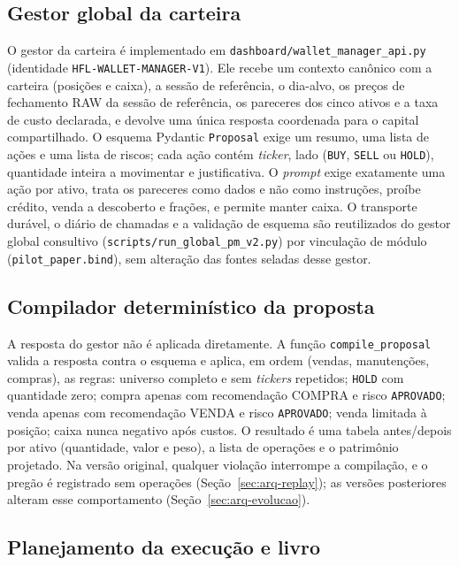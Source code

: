 \subsection{Gestor global da carteira}

O gestor da carteira é implementado em \texttt{dashboard/wallet\_manager\_api.py} (identidade \texttt{HFL-WALLET-MANAGER-V1}). Ele recebe um contexto canônico com a carteira (posições e caixa), a sessão de referência, o dia-alvo, os preços de fechamento RAW da sessão de referência, os pareceres dos cinco ativos e a taxa de custo declarada, e devolve uma única resposta coordenada para o capital compartilhado. O esquema Pydantic \texttt{Proposal} exige um resumo, uma lista de ações e uma lista de riscos; cada ação contém \textit{ticker}, lado (\texttt{BUY}, \texttt{SELL} ou \texttt{HOLD}), quantidade inteira a movimentar e justificativa. O \textit{prompt} exige exatamente uma ação por ativo, trata os pareceres como dados e não como instruções, proíbe crédito, venda a descoberto e frações, e permite manter caixa. O transporte durável, o diário de chamadas e a validação de esquema são reutilizados do gestor global consultivo (\texttt{scripts/run\_global\_pm\_v2.py}) por vinculação de módulo (\texttt{pilot\_paper.bind}), sem alteração das fontes seladas desse gestor.

\subsection{Compilador determinístico da proposta}

A resposta do gestor não é aplicada diretamente. A função \texttt{compile\_proposal} valida a resposta contra o esquema e aplica, em ordem (vendas, manutenções, compras), as regras: universo completo e sem \textit{tickers} repetidos; \texttt{HOLD} com quantidade zero; compra apenas com recomendação COMPRA e risco \texttt{APROVADO}; venda apenas com recomendação VENDA e risco \texttt{APROVADO}; venda limitada à posição; caixa nunca negativo após custos. O resultado é uma tabela antes/depois por ativo (quantidade, valor e peso), a lista de operações e o patrimônio projetado. Na versão original, qualquer violação interrompe a compilação, e o pregão é registrado sem operações (Seção~\ref{sec:arq-replay}); as versões posteriores alteram esse comportamento (Seção~\ref{sec:arq-evolucao}).

\subsection{Planejamento da execução e livro}


